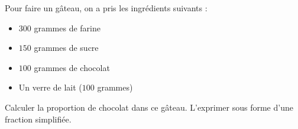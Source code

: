 
\begin{exercice}\label{exosmath-0893}



Pour faire un gâteau, on a pris les ingrédients suivants :
\begin{itemize}
    \item 
 $300$ grammes de farine
 \item
 $150$ grammes de sucre
 \item
 $100$ grammes de chocolat
 \item
 Un verre de lait ($100$ grammes)
\end{itemize}
Calculer la proportion de chocolat dans ce gâteau. L'exprimer sous forme d'une fraction simplifiée.

\end{exercice}
